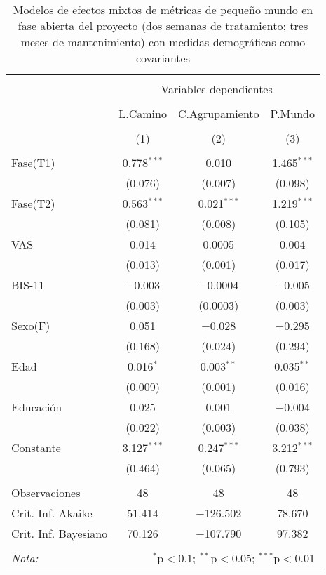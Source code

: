 \begin{table}[!htbp] \centering
    \small
  \caption{Modelos de efectos mixtos de métricas de pequeño mundo en fase abierta del proyecto (dos semanas de tratamiento; tres meses de mantenimiento) con medidas demográficas como covariantes}
  \label{tab:memL12}
\begin{tabular}{@{\extracolsep{5pt}}lccc}
\\[-1.8ex]\hline
\hline \\[-1.8ex]
 & \multicolumn{3}{c}{Variables dependientes} \\
\cline{2-4}
\\[-1.8ex] & L.Camino & C.Agrupamiento & P.Mundo \\
\\[-1.8ex] & (1) & (2) & (3)\\
\hline \\[-1.8ex]
 Fase(T1) & 0.778$^{***}$ & 0.010 & 1.465$^{***}$ \\
  & (0.076) & (0.007) & (0.098) \\
  Fase(T2) & 0.563$^{***}$ & 0.021$^{***}$ & 1.219$^{***}$ \\
  & (0.081) & (0.008) & (0.105) \\
  VAS & 0.014 & 0.0005 & 0.004 \\
  & (0.013) & (0.001) & (0.017) \\
  BIS-11 & $-$0.003 & $-$0.0004 & $-$0.005 \\
  & (0.003) & (0.0003) & (0.003) \\
  Sexo(F) & 0.051 & $-$0.028 & $-$0.295 \\
  & (0.168) & (0.024) & (0.294) \\
  Edad & 0.016$^{*}$ & 0.003$^{**}$ & 0.035$^{**}$ \\
  & (0.009) & (0.001) & (0.016) \\
  Educación & 0.025 & 0.001 & $-$0.004 \\
  & (0.022) & (0.003) & (0.038) \\
  Constante & 3.127$^{***}$ & 0.247$^{***}$ & 3.212$^{***}$ \\
  & (0.464) & (0.065) & (0.793) \\
 \hline \\[-1.8ex]
Observaciones & 48 & 48 & 48 \\
Crit. Inf. Akaike & 51.414 & $-$126.502 & 78.670 \\
Crit. Inf. Bayesiano & 70.126 & $-$107.790 & 97.382 \\
\hline
\hline \\[-1.8ex]
\textit{Nota:}  & \multicolumn{3}{r}{$^{*}$p$<$0.1; $^{**}$p$<$0.05; $^{***}$p$<$0.01} \\
\end{tabular}
\end{table}

